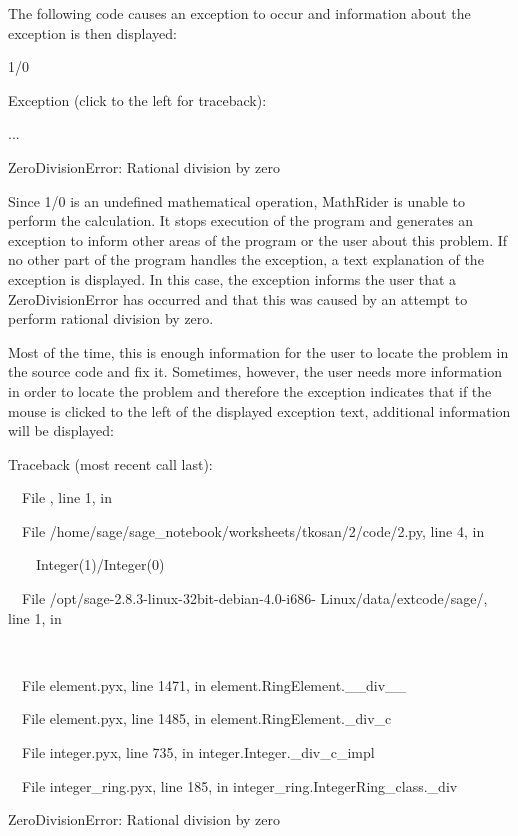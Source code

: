 \documentclass[12pt,oneside]{book}
\begin{document}
The following code causes an exception to occur and information about the exception is then displayed: 

1/0

{\textbar}

Exception (click to the left for traceback):

...

ZeroDivisionError: Rational division by zero


Since 1/0 is an undefined mathematical operation, MathRider is unable to perform the calculation. It stops execution of the program and generates an exception to inform other areas of the program or the user about this problem. If no other part of the program handles the exception, a text explanation of the exception is displayed. In this case, the exception informs the user that a ZeroDivisionError has occurred and that this was caused by an attempt to perform {\textquotedbl}rational division by zero{\textquotedbl}. 

Most of the time, this is enough information for the user to locate the problem in the source code and fix it. Sometimes, however, the user needs more information in order to locate the problem and therefore the exception indicates that if the mouse is clicked to the left of the displayed exception text, additional information will be displayed: 

Traceback (most recent call last):

\ \ File {\textquotedbl}{\textquotedbl}, line 1, in 

\ \ File
{\textquotedbl}/home/sage/sage\_notebook/worksheets/tkosan/2/code/2.py{\textquotedbl},  line 4, in 

\ \ \ \ Integer(1)/Integer(0)

\ \ File {\textquotedbl}/opt/sage{}-2.8.3{}-linux{}-32bit{}-debian{}-4.0{}-i686{}- Linux/data/extcode/sage/{\textquotedbl}, line 1, in 

\ \ \ \ 

\ \ File {\textquotedbl}element.pyx{\textquotedbl}, line 1471, in element.RingElement.\_\_div\_\_

\ \ File {\textquotedbl}element.pyx{\textquotedbl}, line 1485, in element.RingElement.\_div\_c

\ \ File {\textquotedbl}integer.pyx{\textquotedbl}, line 735, in integer.Integer.\_div\_c\_impl

\ \ File {\textquotedbl}integer\_ring.pyx{\textquotedbl}, line 185, in integer\_ring.IntegerRing\_class.\_div

ZeroDivisionError: Rational division by zero
\end{document}
